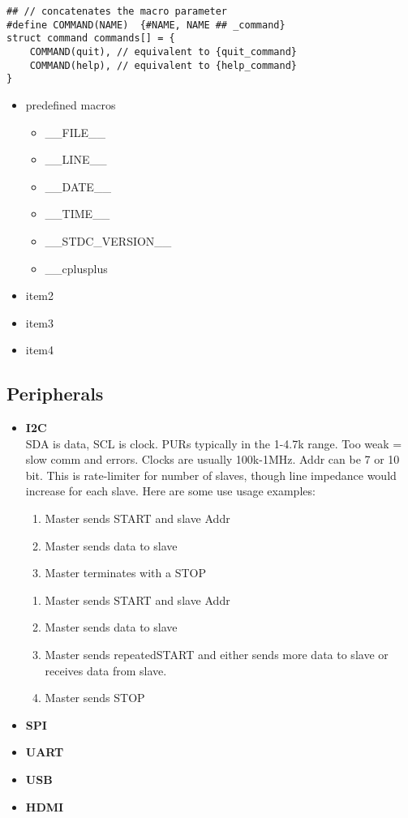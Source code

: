 \documentclass{article}
\begin{document}
\begin{lstlisting}[style=cpp]
## // concatenates the macro parameter
#define COMMAND(NAME)  {#NAME, NAME ## _command}
struct command commands[] = {
	COMMAND(quit), // equivalent to {quit_command}
	COMMAND(help), // equivalent to {help_command}
}
\end{lstlisting}

\begin{itemize}
	\item predefined macros
		\begin{itemize}
			\item \_\_FILE\_\_
			\item \_\_LINE\_\_
			\item \_\_DATE\_\_
			\item \_\_TIME\_\_
			\item \_\_STDC\_VERSION\_\_
			\item \_\_cplusplus
		\end{itemize}
	\item item2
	\item item3
	\item item4
\end{itemize}

\subsection{Peripherals}
\begin{itemize}
	\item \textbf{I2C}\\
		SDA is data, SCL is clock. PURs typically in the 1-4.7k range. Too weak = slow comm and errors. Clocks are usually 100k-1MHz. Addr can be 7 or 10 bit. This is rate-limiter for number of slaves, though line impedance would increase for each slave. Here are some use usage examples:
		\begin{enumerate}
			\item Master sends START and slave Addr
			\item Master sends data to slave
			\item Master terminates with a STOP
		\end{enumerate}
		\begin{enumerate}
			\item Master sends START and slave Addr
			\item Master sends data to slave
			\item Master sends repeatedSTART and either sends more data to slave or receives data from slave.
			\item Master sends STOP
		\end{enumerate}
	\item \textbf{SPI}\\
	\item \textbf{UART}\\
	\item \textbf{USB}\\
	\item \textbf{HDMI}\\
\end{itemize}
\end{document}
